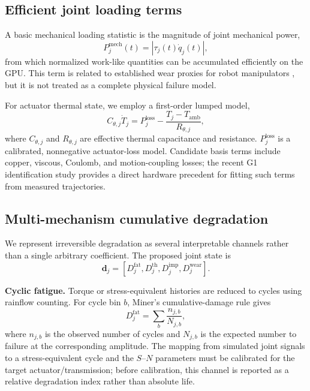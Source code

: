 \documentclass[letterpaper,10pt,conference]{ieeeconf}
\begin{document}
\subsection{Efficient joint loading terms}

A basic mechanical loading statistic is the magnitude of joint mechanical power,
\begin{equation}
P^{\mathrm{mech}}_j(t)=|\tau_j(t)\dot q_j(t)|,
\label{eq:power}
\end{equation}
from which normalized work-like quantities can be accumulated efficiently on the GPU. This term is related to established wear proxies for robot manipulators \cite{kot2021wear}, but it is not treated as a complete physical failure model.

For actuator thermal state, we employ a first-order lumped model,
\begin{equation}
C_{\theta,j}\dot T_j = P^{\mathrm{loss}}_j
-\frac{T_j-T_{\mathrm{amb}}}{R_{\theta,j}},
\label{eq:thermal}
\end{equation}
where $C_{\theta,j}$ and $R_{\theta,j}$ are effective thermal capacitance and resistance. $P^{\mathrm{loss}}_j$ is a calibrated, nonnegative actuator-loss model. Candidate basis terms include copper, viscous, Coulomb, and motion-coupling losses; the recent G1 identification study \cite{deniz2026g1} provides a direct hardware precedent for fitting such terms from measured trajectories.

\subsection{Multi-mechanism cumulative degradation}

We represent irreversible degradation as several interpretable channels rather than a single arbitrary coefficient. The proposed joint state is
\begin{equation}
\mathbf{d}_j =
\left[D^{\mathrm{fat}}_j,
D^{\mathrm{th}}_j,
D^{\mathrm{imp}}_j,
D^{\mathrm{wear}}_j\right].
\label{eq:channels}
\end{equation}

\textbf{Cyclic fatigue.} Torque or stress-equivalent histories are reduced to cycles using rainflow counting. For cycle bin $b$, Miner's cumulative-damage rule gives \cite{miner1945}
\begin{equation}
D^{\mathrm{fat}}_j=
\sum_b \frac{n_{j,b}}{N_{j,b}},
\label{eq:miner}
\end{equation}
where $n_{j,b}$ is the observed number of cycles and $N_{j,b}$ is the expected number to failure at the corresponding amplitude. The mapping from simulated joint signals to a stress-equivalent cycle and the $S$--$N$ parameters must be calibrated for the target actuator/transmission; before calibration, this channel is reported as a relative degradation index rather than absolute life.
\end{document}
